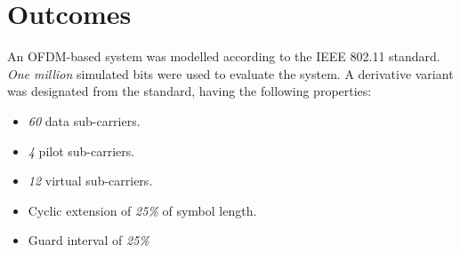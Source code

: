 \chapter{Outcomes}

An OFDM-based system was modelled according to the IEEE 802.11 standard. \emph{One million} simulated bits were used to evaluate the system. A derivative variant was designated from the standard, having the following properties:
\begin{itemize}
	\item \emph{60} data sub-carriers.
	\item \emph{4} pilot sub-carriers.
	\item \emph{12} virtual sub-carriers.
	\item Cyclic extension of \emph{25\%} of symbol length.
	\item Guard interval of \emph{25\%}
\end{itemize}






